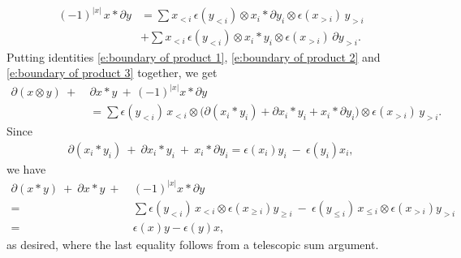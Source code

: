 \begin{equation} \label{e:boundary of product 3}
\begin{split}
(-1)^{|x|} \, x \ast \partial y & = 
\sum x_{<i} \, \epsilon(y_{<i}) \otimes x_i \ast \partial y_i \otimes \epsilon(x_{>i})\, y_{>i} \\ & +
\sum x_{<i}\, \epsilon(y_{<i}) \otimes x_i \ast y_i \otimes \epsilon(x_{>i})\, \partial y_{>i}.
\end{split}
\end{equation}
Putting identities \eqref{e:boundary of product 1}, \eqref{e:boundary of product 2} and \eqref{e:boundary of product 3} together, we get
\begin{align*}
\partial (x \otimes y) \ +\ & \partial x \ast y\ +\, (-1)^{|x|}x \ast \partial y \\
& = \sum \epsilon(y_{<i})\, x_{<i} \otimes \big(\partial(x_i \ast y_i) + \partial x_i \ast y_i + x_i \ast \partial y_i\big) \otimes \epsilon(x_{>i})\, y_{>i}.
\end{align*}
Since
\begin{align*}
\partial(x_i \ast y_i)\ +\ \partial x_i \ast y_i\ +\ x_i \ast \partial y_i =
\epsilon(x_i)y_i\ -\ \epsilon(y_i)x_i,
\end{align*}
we have
\begin{align*}
\partial (x \ast y) \ +\ \partial x \ast y\ +\ & (-1)^{|x|}x \ast \partial y \\ = \ &
\sum \epsilon(y_{<i}) \, x_{<i} \otimes \epsilon(x_{\geq i}) y_{\geq i}\ -\
\epsilon(y_{\leq i}) \, x_{\leq i} \otimes \epsilon(x_{>i}) y_{>i} \\ = \ &
\epsilon(x)y - \epsilon(y)x,
\end{align*}
as desired, where the last equality follows from a telescopic sum argument.